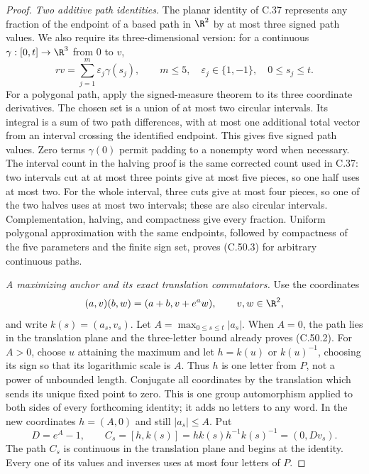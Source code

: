 \begin{proof}
\emph{Two additive path identities.}
The planar identity of C.37 represents any fraction of the
endpoint of a based path in $\R^2$ by at most three signed
path values. We also require its three-dimensional version:
for a continuous $\gamma:[0,t]\to\R^3$ from $0$ to $v$,
\[
              rv=\sum_{j=1}^{m}\varepsilon_j\gamma(s_j),
 \qquad m\leq5,\quad
       \varepsilon_j\in\{1,-1\},\quad 0\leq s_j\leq t .
                                                        \tag{C.50.3}
\]
For a polygonal path, apply the signed-measure theorem
\cite[Theorem~4.7 and \S4.3.2]{C_GrandoniRaviSinghZenklusen2014}
to its three coordinate derivatives.
The chosen set is a union of at most two circular intervals.
Its integral is a sum of two path differences, with at most
one additional total vector from an interval crossing the
identified endpoint. This gives five signed path values.
Zero terms $\gamma(0)$ permit padding to a nonempty word
when necessary.
The interval count in the halving proof is the same corrected
count used in C.37: two intervals cut at at most three points
give at most five pieces, so one half uses at most two.
For the whole interval, three cuts give at most four pieces,
so one of the two halves uses at most two intervals; these
are also circular intervals.
Complementation, halving, and compactness give every
fraction. Uniform polygonal approximation with the same
endpoints, followed by compactness of the five parameters
and the finite sign set, proves (C.50.3) for arbitrary
continuous paths.

\emph{A maximizing anchor and its exact translation commutators.}
Use the coordinates
\[
        (a,v)(b,w)=(a+b,v+e^a w),\qquad
              v,w\in\R^2,
 \]
and write $k(s)=(a_s,v_s)$.
Let $A=\max_{0\leq s\leq t}|a_s|$.
When $A=0$, the path lies in the translation plane and
the three-letter bound already proves (C.50.2).
For $A>0$, choose $u$ attaining the maximum and let
$h=k(u)$ or $k(u)^{-1}$, choosing its sign so that its
logarithmic scale is $A$.
Thus $h$ is one letter from $P$, not a power of unbounded
length. Conjugate all coordinates by the translation
which sends its unique fixed point to zero.
This is one group automorphism applied to both sides
of every forthcoming identity; it adds no letters to
any word. In the new coordinates $h=(A,0)$ and still
$|a_s|\leq A$. Put
\[
 D=e^A-1,\qquad
 C_s=[h,k(s)]
       =h k(s)h^{-1}k(s)^{-1}
       =(0,Dv_s).
                                                        \tag{C.50.4}
\]
The path $C_s$ is continuous in the translation plane
and begins at the identity.
Every one of its values and inverses uses at most four
letters of $P$.


\end{proof}
